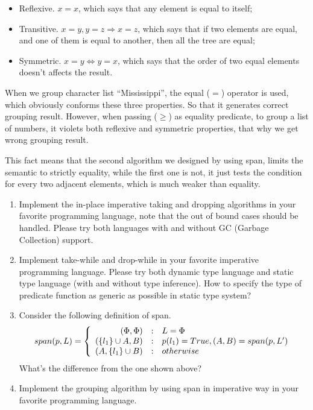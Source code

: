\documentclass{article}
\begin{document}
\begin{itemize}
\item Reflexive. $x = x$, which says that any element is equal to itself;
\item Transitive. $x = y, y = z \Rightarrow x = z$, which says that if two elements are equal, and one of them is equal to another, then all the tree are equal;
\item Symmetric. $x = y \Leftrightarrow y = x$, which says that the order of two equal elements doesn't affects the result.
\end{itemize}

When we group character list ``Mississippi'', the equal ($=$) operator is used, which obviously conforms these
three properties. So that it generates correct grouping result. However, when passing ($\geq$) as equality predicate,
to group a list of numbers, it violets both reflexive and symmetric properties, that why we get wrong grouping result.

This fact means that the second algorithm we designed by using span, limits the semantic to strictly equality, while the
first one is not, it just tests the condition for every two adjacent elements, which is much weaker than equality.

\begin{Exercise}
\begin{enumerate}
\item Implement the in-place imperative taking and dropping algorithms in your favorite programming language, note that
the out of bound cases should be handled. Please try both languages with and without GC (Garbage Collection) support.
\item Implement take-while and drop-while in your favorite imperative programming language. Please try both dynamic
type language and static type language (with and without type inference). How to specify the type of predicate function
as generic as possible in static type system?
\item Consider the following definition of span.
\[
span(p, L) =  \left \{
  \begin{array}
  {r@{\quad:\quad}l}
  (\Phi, \Phi) & L = \Phi \\
  (\{ l_1 \} \cup A, B) & p(l_1) = True, (A, B) = span(p, L') \\
  (A, \{l_1\} \cup B) & otherwise
  \end{array}
\right.
\]
What's the difference from the one shown above?
\item Implement the grouping algorithm by using span in imperative way in your favorite programming language.
\end{enumerate}
\end{Exercise}
\end{document}
